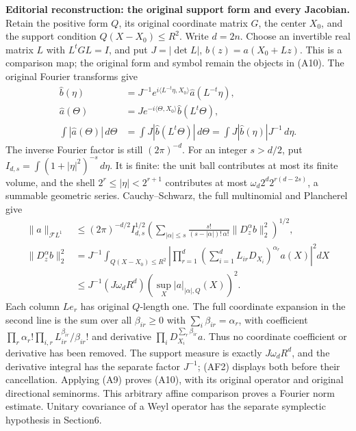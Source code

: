 \documentclass[
  11pt,
]{article}
\begin{document}
\textbf{Editorial reconstruction: the original support form and every
Jacobian.} Retain the positive form \(Q\), its original coordinate
matrix \(G\), the center \(X_0\), and the support condition
\(Q(X-X_0)\le R^2\). Write \(d=2n\). Choose an invertible real matrix
\(L\) with \(L^tGL=I\), and put \(J=|\det L|\), \(b(z)=a(X_0+Lz)\). This
is a comparison map; the original form and symbol remain the objects in
(A10). The original Fourier transforms give \[
\begin{aligned}
\widehat b(\eta)&=J^{-1}e^{i\langle L^{-t}\eta,X_0\rangle}
                  \widehat a(L^{-t}\eta),\\
\widehat a(\Theta)&=J e^{-i\langle\Theta,X_0\rangle}
                    \widehat b(L^t\Theta),\\
\int|\widehat a(\Theta)|\,d\Theta
 &=\int J|\widehat b(L^t\Theta)|\,d\Theta
  =\int J|\widehat b(\eta)|J^{-1}\,d\eta.
\end{aligned}
\tag{AF1}
\] The inverse Fourier factor is still \((2\pi)^{-d}\). For an integer
\(s>d/2\), put \(I_{d,s}=\int(1+|\eta|^2)^{-s}\,d\eta\). It is finite:
the unit ball contributes at most its finite volume, and the shell
\(2^r\le|\eta|<2^{r+1}\) contributes at most \(\omega_d2^d2^{r(d-2s)}\),
a summable geometric series. Cauchy--Schwarz, the full multinomial and
Plancherel give \[
\begin{aligned}
\|a\|_{\mathcal FL^1}
 &\le (2\pi)^{-d/2}I_{d,s}^{1/2}
 \left(\sum_{|\alpha|\le s}
 \frac{s!}{(s-|\alpha|)!\,\alpha!}\|D_z^\alpha b\|_2^2\right)^{1/2},\\
\|D_z^\alpha b\|_2^2
 &=J^{-1}\int_{Q(X-X_0)\le R^2}
  \left|\prod_{r=1}^d\left(\sum_{i=1}^dL_{ir}D_{X_i}\right)^{\alpha_r}a(X)\right|^2dX\\
 &\le J^{-1}(J\omega_dR^d)
                \left(\sup_X|a|_{|\alpha|,Q}(X)\right)^2.
\end{aligned}
\tag{AF2}
\] Each column \(Le_r\) has original \(Q\)-length one. The full
coordinate expansion in the second line is the sum over all
\(\beta_{ir}\ge0\) with \(\sum_i\beta_{ir}=\alpha_r\), with coefficient
\(\prod_r\alpha_r!\prod_{i,r}L_{ir}^{\beta_{ir}}/\beta_{ir}!\) and
derivative \(\prod_iD_{X_i}^{\sum_r\beta_{ir}}a\). Thus no coordinate
coefficient or derivative has been removed. The support measure is
exactly \(J\omega_dR^d\), and the derivative integral has the separate
factor \(J^{-1}\); (AF2) displays both before their cancellation.
Applying (A9) proves (A10), with its original operator and original
directional seminorms. This arbitrary affine comparison proves a Fourier
norm estimate. Unitary covariance of a Weyl operator has the separate
symplectic hypothesis in Section6.
\end{document}
